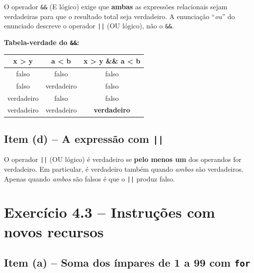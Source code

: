 \documentclass[12pt,a4paper]{article}
\begin{document}
\begin{tcolorbox}[colback=red!5,colframe=deitelred,title={\bfseries FALSO}]
O operador \texttt{\&\&} (E lógico) exige que \textbf{ambas} as expressões relacionais
sejam verdadeiras para que o resultado total seja verdadeiro. A enunciação ``\textit{ou}''
do enunciado descreve o operador \texttt{||} (OU lógico), não o \texttt{\&\&}.

\textbf{Tabela-verdade do \texttt{\&\&}:}
\begin{center}
\renewcommand{\arraystretch}{1.3}
\begin{tabular}{c c c}
  \toprule
  \textbf{x > y} & \textbf{a < b} & \textbf{x > y \&\& a < b} \\ \midrule
  falso & falso & falso \\
  falso & verdadeiro & falso \\
  verdadeiro & falso & falso \\
  verdadeiro & verdadeiro & \textbf{verdadeiro} \\
  \bottomrule
\end{tabular}
\end{center}
\end{tcolorbox}

\subsection*{Item (d) -- A expressão com \texttt{||}}

\begin{tcolorbox}[colback=green!5,colframe=deitelgreen,title={\bfseries VERDADEIRO}]
O operador \texttt{||} (OU lógico) é verdadeiro se \textbf{pelo menos um} dos
operandos for verdadeiro. Em particular, é verdadeiro também quando \textit{ambos}
são verdadeiros. Apenas quando \textit{ambos} são falsos é que o \texttt{||}
produz falso.
\end{tcolorbox}

\newpage

\section{Exercício 4.3 -- Instruções com novos recursos}

\subsection*{Item (a) -- Soma dos ímpares de 1 a 99 com \texttt{for}}
\end{document}

